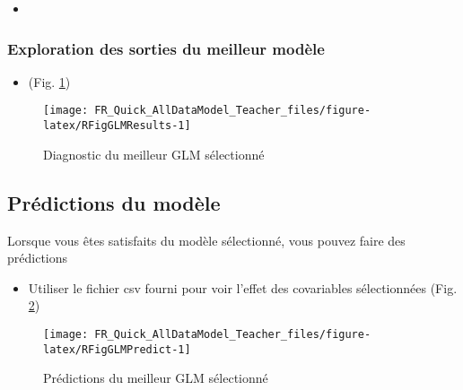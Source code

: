 \documentclass[french,a4paper]{article}
\providecommand{\tightlist}{%
  \setlength{\itemsep}{0pt}\setlength{\parskip}{0pt}}
\begin{document}
\begin{itemize}
\tightlist
\item
\end{itemize}

\subsubsection{Exploration des sorties du meilleur
modèle}\label{exploration-des-sorties-du-meilleur-modele}

\begin{itemize}
\tightlist
\item
  (Fig. \ref{fig:RFigGLMResults})
\end{itemize}



\begin{figure}[!h]

{\centering \texttt{[image: FR\_Quick\_AllDataModel\_Teacher\_files/figure-latex/RFigGLMResults-1]} 

}

\caption{Diagnostic du meilleur GLM sélectionné}\label{fig:RFigGLMResults}
\end{figure}

\subsection{Prédictions du modèle}\label{predictions-du-modele}

Lorsque vous êtes satisfaits du modèle sélectionné, vous pouvez faire
des prédictions

\begin{itemize}
\tightlist
\item
  Utiliser le fichier csv fourni pour voir l'effet des covariables
  sélectionnées (Fig. \ref{fig:RFigGLMPredict})
\end{itemize}



\begin{figure}[!h]

{\centering \texttt{[image: FR\_Quick\_AllDataModel\_Teacher\_files/figure-latex/RFigGLMPredict-1]} 

}

\caption{Prédictions du meilleur GLM sélectionné}\label{fig:RFigGLMPredict}
\end{figure}
\end{document}
